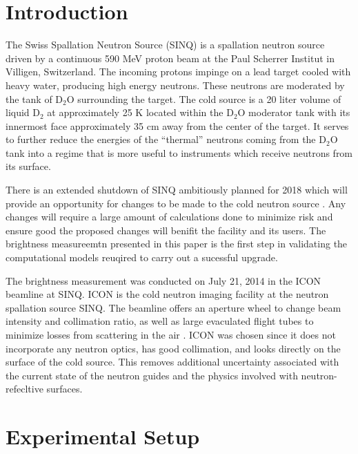 \documentclass[preprint,12pt]{elsarticle}
\begin{document}
\linenumbers


\section{Introduction}
\label{sec:intro}

The Swiss Spallation Neutron Source (SINQ) is a spallation neutron source driven by a continuous 590 MeV proton beam at the Paul Scherrer Institut in Villigen, Switzerland.  The incoming protons impinge on a lead target cooled with heavy water, producing high energy neutrons.  These neutrons are moderated by the tank of D$_2$O surrounding the target.  The cold source is a 20 liter volume of liquid D$_2$ at approximately 25 K located within the D$_2$O moderator tank with its innermost face approximately 35 cm away from the center of the target.  It serves to further reduce the energies of the ``thermal'' neutrons coming from the D$_2$O tank into a regime that is more useful to instruments which receive neutrons from its surface.  

There is an extended shutdown of SINQ ambitiously planned for 2018 which will provide an opportunity for changes to be made to the cold neutron source \cite{rueegg_icans}.  Any changes will require a large amount of calculations done to minimize risk and ensure good the proposed changes will benifit the facility and its users.  The brightness measureemtn presented in this paper is the first step in validating the computational models reuqired to carry out a sucessful upgrade.  

The brightness measurement was conducted on July 21, 2014 in the ICON beamline at SINQ.  ICON is the cold neutron imaging facility at the neutron spallation source SINQ. The beamline offers an aperture wheel to change beam intensity and collimation ratio, as well as large evaculated flight tubes to minimize losses from scattering in the air \cite{icon}.  ICON was chosen since it does not incorporate any neutron optics, has good collimation, and looks directly on the surface of the cold source.  This removes additional uncertainty associated with the current state of the neutron guides and the physics involved with neutron-refecltive surfaces.


%
%
%
%
%


\section{Experimental Setup}
\label{sec:setup}
\end{document}
